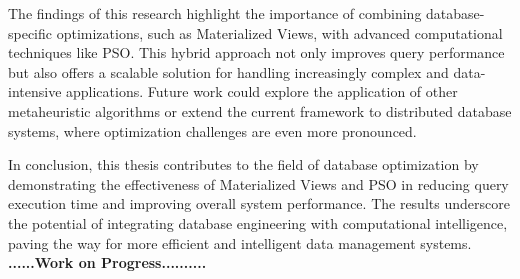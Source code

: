 The findings of this research highlight the importance of combining database-specific optimizations, such as Materialized Views, with advanced computational techniques like PSO. This hybrid approach not only improves query performance but also offers a scalable solution for handling increasingly complex and data-intensive applications. Future work could explore the application of other metaheuristic algorithms or extend the current framework to distributed database systems, where optimization challenges are even more pronounced.

In conclusion, this thesis contributes to the field of database optimization by demonstrating the effectiveness of Materialized Views and PSO in reducing query execution time and improving overall system performance. The results underscore the potential of integrating database engineering with computational intelligence, paving the way for more efficient and intelligent data management systems.\\
\textbf{......\textbf{Work on Progress}..........}       